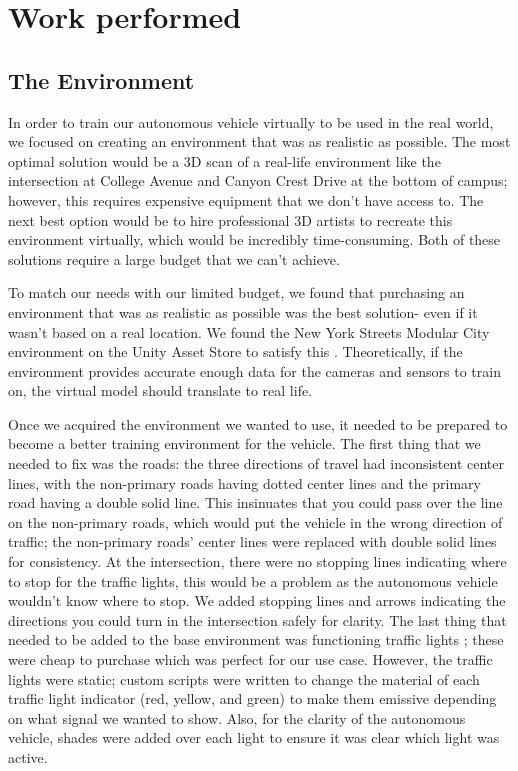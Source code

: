 \documentclass[conference]{IEEEtran}
\begin{document}
\section{Work performed}
\subsection{The Environment}
In order to train our autonomous vehicle virtually to be used in the real world, we focused on creating an environment that was as realistic as possible. The most optimal solution would be a 3D scan of a real-life environment like the intersection at College Avenue and Canyon Crest Drive at the bottom of campus; however, this requires expensive equipment that we don't have access to. The next best option would be to hire professional 3D artists to recreate this environment virtually, which would be incredibly time-consuming. Both of these solutions require a large budget that we can't achieve.\par
To match our needs with our limited budget, we found that purchasing an environment that was as realistic as possible was the best solution- even if it wasn't based on a real location. We found the New York Streets Modular City environment on the Unity Asset Store to satisfy this \cite{newYorkStreets2024}. Theoretically, if the environment provides accurate enough data for the cameras and sensors to train on, the virtual model should translate to real life.\par
Once we acquired the environment we wanted to use, it needed to be prepared to become a better training environment for the vehicle. The first thing that we needed to fix was the roads: the three directions of travel had inconsistent center lines, with the non-primary roads having dotted center lines and the primary road having a double solid line. This insinuates that you could pass over the line on the non-primary roads, which would put the vehicle in the wrong direction of traffic; the non-primary roads' center lines were replaced with double solid lines for consistency. At the intersection, there were no stopping lines indicating where to stop for the traffic lights, this would be a problem as the autonomous vehicle wouldn't know where to stop. We added stopping lines and arrows indicating the directions you could turn in the intersection safely for clarity. The last thing that needed to be added to the base environment was functioning traffic lights \cite{trafficLights2024}; these were cheap to purchase which was perfect for our use case. However, the traffic lights were static; custom scripts were written to change the material of each traffic light indicator (red, yellow, and green) to make them emissive depending on what signal we wanted to show. Also, for the clarity of the autonomous vehicle, shades were added over each light to ensure it was clear which light was active.\par
\end{document}
